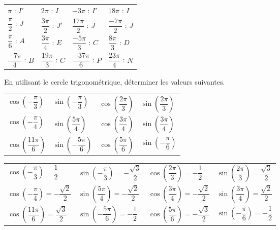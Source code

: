 \documentclass[11pt,fleqn, openany]{book} %
\begin{document}
\begin{solution}

\renewcommand{\arraystretch}{2}\begin{tabularx}{\linewidth}{XXXX}
$\pi$ : $I'$ & $2\pi$ : $I$ & $-3\pi$ : $I'$ & $18\pi$ : $I$ \\
$\dfrac{\pi}{2}$ : $J$& $\dfrac{3\pi}{2}$ : $J'$ & $\dfrac{17\pi}{2}$ : $J$ & $\dfrac{-7\pi}{2}$ : $J$\\
$\dfrac{\pi}{6}$ : $A$& $\dfrac{3\pi}{4}$ : $E$ & $\dfrac{-5\pi}{3}$ : $C$ & $\dfrac{8\pi}{3}$ : $D$\\
$\dfrac{-7\pi}{4}$ : $B$ & $\dfrac{19\pi}{3}$ : $C$ & $\dfrac{-37\pi}{6}$ : $P$ & $\dfrac{23\pi}{4}$ : $N$\end{tabularx}

\end{solution}



\begin{exercise} En utilisant le cercle trigonométrique, déterminer les valeurs suivantes.

\begin{tabularx}{\linewidth}{XXXX}
$\cos \left( -\dfrac{\pi}{3} \right)$ & $\sin \left(- \dfrac{\pi}{3} \right)$ & $\cos \left( \dfrac{2\pi}{3} \right)$ & $\sin \left( \dfrac{2\pi}{3} \right)$ \\
$\cos \left( -\dfrac{\pi}{4} \right)$ & $\sin \left( \dfrac{5\pi}{4} \right)$ & $\cos \left( \dfrac{3\pi}{4} \right)$ & $\sin \left( \dfrac{3\pi}{4} \right)$ \\
$\cos \left( \dfrac{11\pi}{6} \right)$ & $\sin \left(- \dfrac{5\pi}{6} \right)$ & $\cos \left( \dfrac{5\pi}{6} \right)$ & $\sin \left( -\dfrac{\pi}{6} \right)$ 
\end{tabularx}\end{exercise}


\begin{solution}

\begin{tabularx}{\linewidth}{XXXX}
$\cos \left( -\dfrac{\pi}{3} \right) = \dfrac{1}{2}$ & $\sin \left(- \dfrac{\pi}{3} \right)=-\dfrac{\sqrt{3}}{2}$ & $\cos \left( \dfrac{2\pi}{3} \right) = -\dfrac{1}{2}$ & $\sin \left( \dfrac{2\pi}{3} \right) = \dfrac{\sqrt{3}}{2}$ \\
$\cos \left( -\dfrac{\pi}{4} \right) = -\dfrac{\sqrt{2}}{2}$ & $\sin \left( \dfrac{5\pi}{4} \right)=-\dfrac{\sqrt{2}}{2}$ & $\cos \left( \dfrac{3\pi}{4} \right)=-\dfrac{\sqrt{2}}{2}$ & $\sin \left( \dfrac{3\pi}{4} \right) = \dfrac{\sqrt{2}}{2}$ \\
$\cos \left( \dfrac{11\pi}{6} \right)=\dfrac{\sqrt{3}}{2}$ & $\sin \left(- \dfrac{5\pi}{6} \right)=-\dfrac{1}{2}$ & $\cos \left( \dfrac{5\pi}{6} \right)=-\dfrac{\sqrt{3}}{2}$ & $\sin \left( -\dfrac{\pi}{6} \right)=-\dfrac{1}{2}$ 
\end{tabularx}\end{solution}
\end{document}
